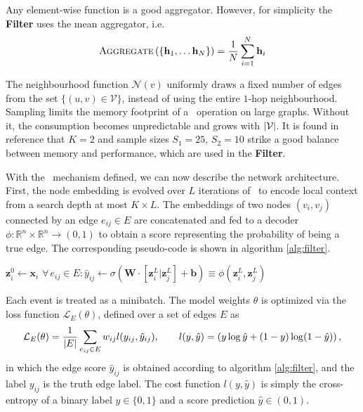 Any element-wise function is a good aggregator. 
However, for simplicity the \textbf{Filter} uses the mean aggregator, i.e.
\begin{equation}
    \label{eq:10.1}
    \textsc{Aggregate}\left( \{ \mathbf{h}_1 ,\dotsc  \mathbf{h}_N \}\right) = \frac{1}{N} \sum_{i=1} ^N \mathbf{h}_i
\end{equation}

The neighbourhood function $\mathcal{N}(v)$ uniformly draws a fixed number of edges from the set $\{(u,v)\in \mathcal{V} \}$, instead of using the entire $1$-hop neighbourhood.
Sampling limits the memory footprint of a \graphsage~operation on large graphs. 
Without it, the consumption becomes unpredictable and grows with $\abs{\mathcal{V}}$.
It is found in reference \cite{graphsage} that $K=2$ and sample sizes $S_1=25$, $S_2=10$ strike a good balance between memory and performance, which are used in the \textbf{Filter}.

With the \graphsage~mechanism defined, we can now describe the network architecture. 
First, the node embedding is evolved over $L$ iterations of \graphsage~to encode local context from a search depth at most $K\times L$. 
The embeddings of two nodes $(v_i, v_j)$ connected by an edge $e_{ij} \in {E}$ are concatenated and fed to a decoder $\phi: \mathbb{R}^n\times \mathbb{R}^n\rightarrow (0,1)$ to obtain a score representing the probability of being a true edge.
The corresponding pseudo-code is shown in algorithm \ref{alg:filter}.

\begin{algorithm}
\caption{The \textbf{Filter} network }\label{alg:filter}
$\mathbf{z}^0_{i} \gets \mathbf{x}_i$\;
$\forall \,  e_{ij} \in E: \hat{y}_{ij} \gets \sigma(\mathbf{W}\cdot [\mathbf{z}_i^L | \mathbf{z}_j^L] + \mathbf{b}) \equiv \phi(\mathbf{z}_i^L, \mathbf{z}_j^L)$ 
\end{algorithm}

Each event is treated as a minibatch. The model weights $\theta$ is optimized via the loss function $\mathcal{L}_{E} (\theta)$, defined over a set of edges $E$ as
\begin{equation}
    \label{eq:10.2}
    \mathcal{L}_{E}(\theta) =  \frac{1}{\abs{E}} \sum_{e_{ij}\in E} w_{ij}l(y_{ij}, \hat{y}_{ij}), \quad \quad l(y, \hat{y}) = \left( y\log \hat{y} + (1-y) \log(1-\hat{y} ) \right),
\end{equation}
in which the edge score $\hat{y}_{ij}$ is obtained according to algorithm \ref{alg:filter}, and the label $y_{ij}$ is the truth edge label.
The cost function $l(y,\hat{y})$ is simply the cross-entropy of a binary label $y\in\{0,1\}$ and a score prediction $\hat{y}\in(0,1)$. 

